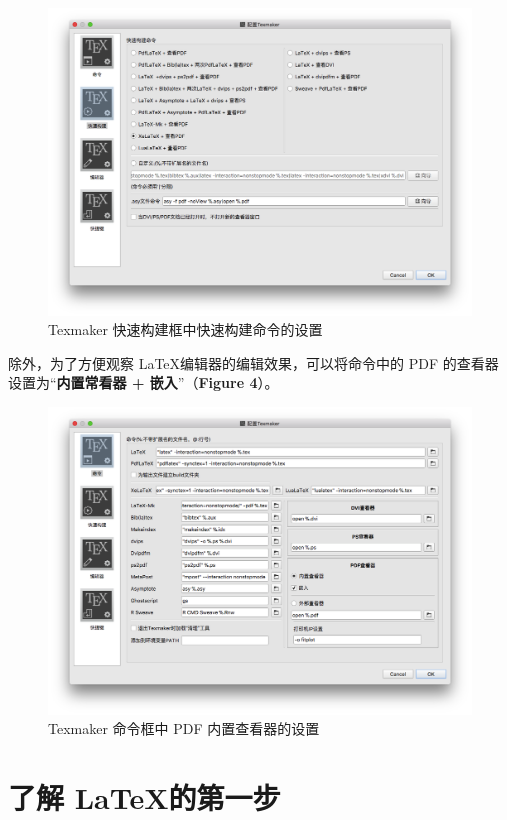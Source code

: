 \documentclass[a4paper, 11pt, titlepage]{article}
\begin{document}
\begin{figure}[hbtp]
\centering
\includegraphics[width = 14cm]{Figure_03.png}
\caption{Texmaker 快速构建框中快速构建命令的设置}
\end{figure}

除外，为了方便观察 \LaTeX 编辑器的编辑效果，可以将命令中的 PDF 的查看器设置为“\textbf{内置常看器 + 嵌入}”（\textbf{Figure 4}）。\par

\begin{figure}[hbtp]
\centering
\includegraphics[width = 14cm]{Figure_04.png}
\caption{Texmaker 命令框中 PDF 内置查看器的设置}
\end{figure}

\section{了解 \LaTeX 的第一步}
\end{document}
